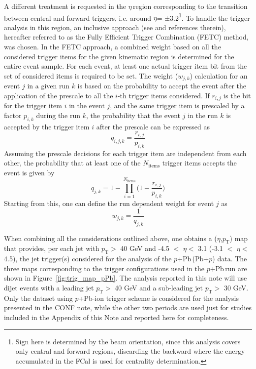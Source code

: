\documentclass[NOTE, atlasdraft=true, texlive=2020, UKenglish]{atlasdoc}
\newcommand{\PT}{$p_{\text{T}}$}
\newcommand{\ETA}{$\eta$}
\newcommand{\pxPb}{$p$+Pb}
\newcommand{\Pbxp}{Pb+$p$}
\newcommand{\TN}[1]{ \text{#1} }
\begin{document}
A different treatment is requested in the \ETA\,region corresponding to the transition between central and forward triggers, i.e. around \ETA = $\pm$3.2\footnote{Sign here is determined by the beam orientation, since this analysis covers only central and forward regions, discarding the backward where the energy accumulated in the FCal is used for centrality determination.}. To handle the trigger analysis in this region, an inclusive approach (see \cite{Lendermann:2009ah} and references therein), hereafter referred to as the Fully Efficient Trigger Combination (FETC) method, was chosen. 
In the FETC approach, a combined weight based on all the considered trigger items for the given kinematic region is determined for the entire event sample. For each event, at least one actual trigger item bit from the set of considered items is required to be set. The weight ($w_{j,k}$) calculation for an event $j$ in a given run $k$ is based on the probability to accept the event after the application of the prescale to all the $i$-th trigger items considered. 
If $r_{i,j}$ is the bit for the trigger item $i$ in the event $j$, and the same trigger item is prescaled by a factor $p_{i,k}$ during the run $k$, the probability that the event $j$ in the run $k$ is accepted by the trigger item $i$ after the prescale can be expressed as
\begin{equation}
    q_{i,j,k} = \frac{r_{i,j}}{p_{i,k}}
\end{equation}
Assuming the prescale decisions for each trigger item are independent from each other, the probability that at least one of the $N_{\TN{items}}$ trigger items accepts the event is given by 
\begin{equation}
    q_{j,k} = 1 - \prod^{N_{\TN{items}}}_{i=1} \biggl ( 1-\frac{r_{i,j}}{p_{i,k}}\biggr )
\end{equation}
Starting from this, one can define the run dependent weight for event $j$ as 
\begin{equation}
    w_{j,k} = \frac{1}{q_{j,k}}
\end{equation}

When combining all the considerations outlined above, one obtains a (\ETA,\PT{}) map that provides, per each jet with \PT{}$>$ 40 GeV
and -4.5 $<$ \ETA $<$ 3.1 (-3.1 $<$ \ETA $<$ 4.5), the jet trigger(s) considered for the analysis of the \pxPb\,(\Pbxp) data. The three maps corresponding to the trigger configurations used in the \pxPb\,run are shown in Figure~\ref{fig:trig_map_pPb}. The analysis reported in this note will use dijet events with a leading jet 
\PT{}$>$ 40 GeV and a sub-leading jet \PT{}$>$ 30 GeV. Only the dataset using \pxPb-ion trigger scheme is considered for the analysis presented in the CONF note, while the other two periods are used just for studies included in the Appendix of this Note and reported here for completeness. 
\end{document}

